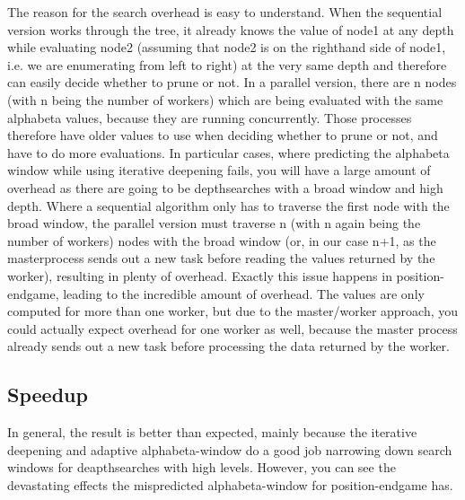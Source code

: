The reason for the search overhead is easy to understand. When the sequential version works through the tree, it already knows the value of node1 at any depth while evaluating node2 (assuming that node2 is on the righthand side of node1, i.e. we are enumerating from left to right) at the very same depth and therefore can easily decide whether to prune or not. In a parallel version, there are n nodes (with n being the number of workers) which are being evaluated with the same alphabeta values, because they are running concurrently. Those processes therefore have older values to use when deciding whether to prune or not, and have to do more evaluations. In particular cases, where predicting the alphabeta window while using iterative deepening fails, you will have a large amount of overhead as there are going to be depthsearches with a broad window and high depth. Where a sequential algorithm only has to traverse the first node with the broad window, the parallel version must traverse n (with n again being the number of workers) nodes with the broad window (or, in our case n+1, as the masterprocess sends out a new task before reading the values returned by the worker), resulting in plenty of overhead. Exactly this issue happens in position-endgame, leading to the incredible amount of overhead.
The values are only computed for more than one worker, but due to the master/worker approach, you could actually expect overhead for one worker as well, because the master process already sends out a new task before processing the data returned by the worker.

\subsection*{Speedup}

In general, the result is better than expected, mainly because the iterative deepening and adaptive alphabeta-window do a good job narrowing down search windows for deapthsearches with high levels. However, you can see the devastating effects the mispredicted alphabeta-window for position-endgame has.

